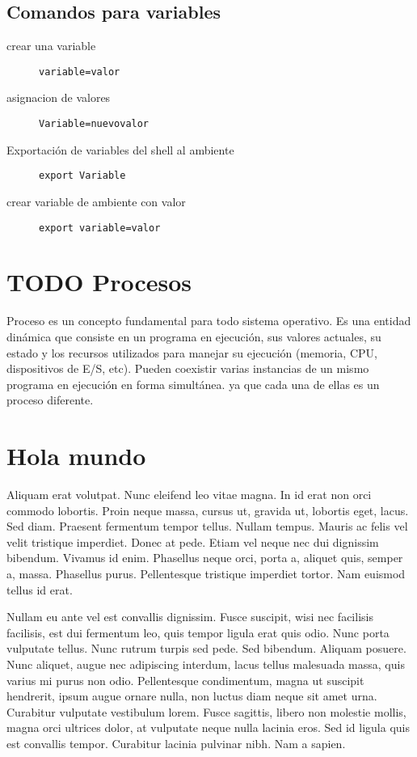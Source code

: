 \documentclass[11pt]{article}
\begin{document}
\subsection{Comandos para variables}
\label{sec:orge1f071d}
\begin{description}
\item[{crear una variable}] \texttt{variable=valor}

\item[{asignacion de valores}] \texttt{Variable=nuevovalor}

\item[{Exportación de variables del shell al ambiente}] \texttt{export Variable}

\item[{crear variable de ambiente con valor}] \texttt{export variable=valor}
\end{description}

\section{{\bfseries\sffamily TODO} Procesos}
\label{sec:org8cb6c4b}
Proceso es un concepto fundamental para todo sistema operativo. Es una
entidad dinámica que consiste en un programa en ejecución, sus valores
actuales, su estado y los recursos utilizados para manejar su
ejecución (memoria, CPU, dispositivos de E/S, etc). Pueden coexistir
varias instancias de un mismo programa en ejecución en forma
simultánea. ya que cada una de ellas es un proceso diferente. 

\pagebreak
\section{Hola mundo}
\label{sec:org321833c}
Aliquam erat volutpat.  Nunc eleifend leo vitae magna.  In id erat non
orci commodo lobortis.  Proin neque massa, cursus ut, gravida ut,
lobortis eget, lacus.  Sed diam.  Praesent fermentum tempor tellus.
Nullam tempus.  Mauris ac felis vel velit tristique imperdiet.  Donec
at pede.  Etiam vel neque nec dui dignissim bibendum.  Vivamus id
enim.  Phasellus neque orci, porta a, aliquet quis, semper a, massa.
Phasellus purus.  Pellentesque tristique imperdiet tortor.  Nam
euismod tellus id erat. 

Nullam eu ante vel est convallis dignissim.  Fusce suscipit, wisi nec
facilisis facilisis, est dui fermentum leo, quis tempor ligula erat
quis odio.  Nunc porta vulputate tellus.  Nunc rutrum turpis sed pede.
Sed bibendum.  Aliquam posuere.  Nunc aliquet, augue nec adipiscing
interdum, lacus tellus malesuada massa, quis varius mi purus non odio.
Pellentesque condimentum, magna ut suscipit hendrerit, ipsum augue
ornare nulla, non luctus diam neque sit amet urna.  Curabitur
vulputate vestibulum lorem.  Fusce sagittis, libero non molestie
mollis, magna orci ultrices dolor, at vulputate neque nulla lacinia
eros.  Sed id ligula quis est convallis tempor.  Curabitur lacinia
pulvinar nibh.  Nam a sapien. 
\end{document}
